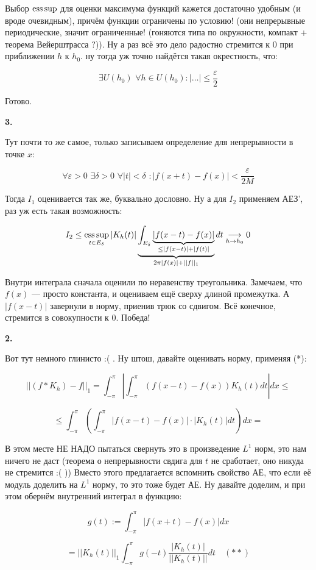 \documentclass{article}
\def\dbl{\,\,}
\def\goesto#1{\underset{#1}{\longrightarrow}}
\begin{document}
Выбор $\operatorname*{ess\,sup}$ для оценки максимума функций кажется достаточно удобным (и вроде очевидным), причём функции ограничены по условию! (они непрерывные периодические, значит ограниченные! (гоняются типа по окружности, компакт + теорема Вейерштрасса ?)). Ну а раз всё это дело радостно стремится к 0 при приближении $h$ к $h_0$. ну тогда уж точно найдётся такая окрестность, что:

\[\exists U(h_0) \dbl \forall h \in U(h_0): |\ldots| \le \frac{\varepsilon}{2}\]

Готово.

\textbf{3. }

Тут почти то же самое, только записываем определение для непрерывности в точке $x$:

\[\forall \varepsilon > 0 \dbl \exists \delta > 0 \dbl \forall |t| < \delta \dbl : |f(x + t) - f(x)| < \frac{\varepsilon}{2M}\]

Тогда $I_1$ оценивается так же, буквально дословно. Ну а для $I_2$ применяем АЕЗ', раз уж есть такая возможность:

\[I_2 \le \esssup_{t \in E_\delta}|K_h(t)| \underbrace{\int_{E_\delta} \underbrace{|f(x - t) - f(x)|}_{\le |f(x - t)| + |f(t)|}}_{2\pi|f(x)| + ||f||_1} dt  \goesto{h \rightarrow h_0} 0\]

Внутри интеграла сначала оценили по неравенству треугольника. Замечаем, что $f(x)$ --- просто константа, и оцениваем ещё сверху длиной промежутка. А $|f(x - t)|$ завернули в норму, приенив трюк со сдвигом. Всё конечное, стремится в совокупности к 0. Победа!

\textbf{2. }

Вот тут немного глинисто :( . Ну штош, давайте оценивать норму, применяя (*):

\[||(f * K_h) - f||_1 = \int_{-\pi}^{\pi} \left| \int_{-\pi}^{\pi} (f(x - t) - f(x))K_h(t) dt\right| dx \le \] 

\[ \le \int_{-\pi}^{\pi} \left(\int_{-\pi}^{\pi} |f(x - t) - f(x)| \cdot |K_h(t)| dt \right)dx = \]

В этом месте НЕ НАДО пытаться свернуть это в произведение $L^1$ норм, это нам ничего не даст (теорема о непрерывности свдига для $t$ не сработает, оно никуда не стремится :( )) Вместо этого предлагается вспомнить свойство АЕ, что если её модуль доделить на $L^1$ норму, то это тоже будет АЕ. Ну давайте доделим, и при этом обернём внутренний интеграл в функцию:

\[g(t) := \int_{-\pi}^{\pi} |f(x + t) - f(x)| dx\]

\[ = ||K_h(t)||_1\int_{-\pi}^{\pi} g(-t) \frac{|K_h(t)|}{||K_h(t)||}dt \quad (**)\]
\end{document}
